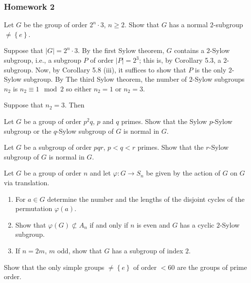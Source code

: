\subsubsection{Homework 2}
\setcounter{exercise}{0}
\setcounter{equation}{0}

\begin{problem}
  Let $G$ be the group of order $2^n\cdot 3$, $n\geq 2$. Show that $G$ has
  a normal $2$-subgroup $\neq\left\{e\right\}$.
\end{problem}
\begin{solution}
  Suppose that $|G|=2^n\cdot 3$. By the first Sylow theorem, $G$ contains a
  $2$-Sylow subgroup, i.e., a subgroup $P$ of order $|P|=2^3$; this is, by
  Corollary 5.3, a $2$-subgroup. Now, by Corollary 5.8 (iii), it suffices
  to show that $P$ is the only $2$-Sylow subgroup. By The third Sylow
  theorem, the number of $2$-Sylow subgroups $n_2$ is $n_2\equiv 1\mod 2$
  so either $n_2=1$ or $n_2=3$.

  Suppose that $n_2=3$. Then
\end{solution}

\begin{problem}
  Let $G$ be a group of order $p^2q$, $p$ and $q$ primes. Show that the
  Sylow $p$-Sylow subgroup or the $q$-Sylow subgroup of $G$ is normal in
  $G$.
\end{problem}
\begin{solution}
\end{solution}

\begin{problem}
  Let $G$ be a subgroup of order $pqr$, $p<q<r$ primes. Show that the
  $r$-Sylow subgroup of $G$ is normal in $G$.
\end{problem}
\begin{solution}
\end{solution}

\begin{problem}
  Let $G$ be a group of order $n$ and let $\varphi\colon G\to S_n$ be given
  by the action of $G$ on $G$ via translation.
  \begin{enumerate}[label=(\alph*),noitemsep]
  \item For $a\in G$ determine the number and the lengths of the disjoint
    cycles of the permutation $\varphi(a)$.
  \item Show that $\varphi(G)\nsubset A_n$ if and only if $n$ is even and
    $G$ has a cyclic $2$-Sylow subgroup.
  \item If $n=2m$, $m$ odd, show that $G$ has a subgroup of index $2$.
  \end{enumerate}
\end{problem}
\begin{solution}
\end{solution}

\begin{problem}
  Show that the only simple groups $\neq\left\{e\right\}$ of order $<60$
  are the groups of prime order.
\end{problem}
\begin{solution}
\end{solution}

